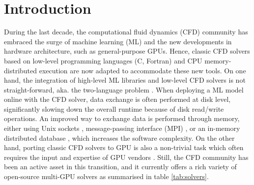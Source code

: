 \documentclass[final,3p,times]{elsarticle}
\begin{document}
\section{Introduction}

During the last decade, the computational fluid dynamics (CFD) community has embraced the surge of machine learning (ML) and the new developments in hardware architecture, such as general-purpose GPUs. Hence, classic CFD solvers based on low-level programming languages (C, Fortran) and CPU memory-distributed execution are now adapted to accommodate these new tools. On one hand, the integration of high-level ML libraries and low-level CFD solvers is not straight-forward, aka. the two-language problem \cite{Churavy2022}. When deploying a ML model online with the CFD solver, data exchange is often performed at disk level, significantly slowing down the overall runtime because of disk read/write operations. An improved way to exchange data is performed through memory, either using Unix sockets \cite{Rabault2019, Font2021}, message-passing interface (MPI) \cite{Guastoni2023}, or an in-memory distributed database \cite{Kurz2022,Font2024}, which increases the software complexity. On the other hand, porting classic CFD solvers to GPU is also a non-trivial task which often requires the input and expertise of GPU vendors \cite{Romero2022}. Still, the CFD community has been an active asset in this transition, and it currently offers a rich variety of open-source multi-GPU solvers as summarised in table \ref{tab:solvers}.
\end{document}
